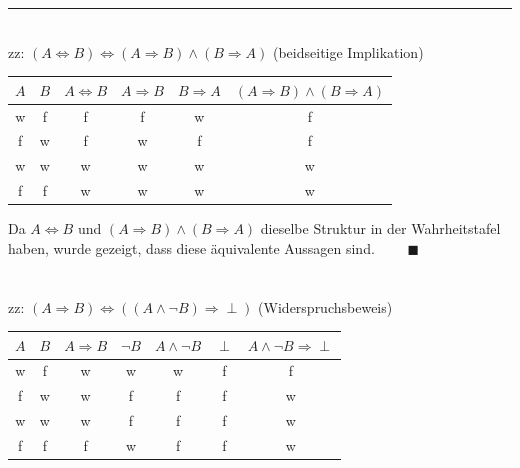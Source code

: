 \documentclass{article}
\begin{document}
{\color{violet}
\hrule
	\\
	zz: $(A\Leftrightarrow B) \Leftrightarrow (A \Rightarrow B) \wedge (B \Rightarrow A)$ (beidseitige Implikation)
		\begin{table}[h]
			\centering
			\begin{tabular}{c|c||c||c|c|c}
				\hline\hline
					$A$ & $B$ & $A \Leftrightarrow B$ & $A \Rightarrow B$ & $B \Rightarrow A$ & $(A \Rightarrow B) \wedge (B \Rightarrow A)$ \\
				\hline
					w & f & f & f & w & f \\
					f & w & f & w & f & f \\
					w & w & w & w & w & w \\
					f & f & w & w & w & w \\
				\hline\hline
			\end{tabular}		
		\end{table}
	
	Da $A \Leftrightarrow B$ und $(A \Rightarrow B) \wedge (B \Rightarrow A)$ dieselbe Struktur in der Wahrheitstafel haben, wurde gezeigt, dass diese äquivalente Aussagen sind. $\qquad \blacksquare$\\
	\\
	\\
	zz: $(A\Rightarrow B) \Leftrightarrow ((A\wedge \neg B) \Rightarrow \perp)$ (Widerspruchsbeweis)
		\begin{table}[h]
			\centering
			\begin{tabular}{c|c||c||c|c|c|c}
				\hline\hline
					$A$ & $B$ & $A \Rightarrow B$ & $\neg B$ & $A \wedge \neg B$ & $\perp$ & $A \wedge \neg B \Rightarrow \perp$ \\
				\hline
					w & f & w & w & w & f & f \\
					f & w & w & f & f & f & w \\
					w & w & w & f & f & f & w \\
					f & f & f & w & f & f & w \\
				\hline\hline
			\end{tabular}		
		\end{table}
	
}
\end{document}
